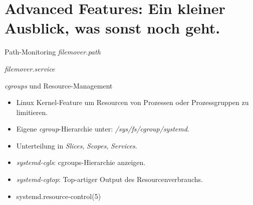 \section[Advanced]{Advanced Features: Ein kleiner Ausblick, was sonst
noch geht.}



\begin{frame}{Path-Monitoring}
\emph{filemover.path}
\footnotesize


{\normalsize\emph{filemover.service}}

\end{frame}


\begin{frame}{\emph{cgroups} und Resource-Management}
\begin{itemize}
\item Linux Kernel-Feature um Resourcen von Prozessen oder
Prozessgruppen zu limitieren.
\item Eigene \emph{cgroup}-Hierarchie unter: \emph{/sys/fs/cgroup/systemd}.
\item Unterteilung in \emph{Slices}, \emph{Scopes}, \emph{Services}.
\item \emph{systemd-cgls}: cgroups-Hierarchie anzeigen.
\item \emph{systemd-cgtop}: Top-artiger Output des Resourcenverbrauchs.
\item systemd.resource-control(5)
\end{itemize}
\end{frame}



